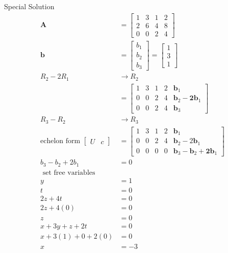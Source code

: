 \documentclass[main.tex]{subfiles}
\begin{document}
\begin{enumerate}
    Special Solution
    $$
    \begin{aligned}
    \boldsymbol{A} &=\left[\begin{array}{llll}
    1 & 3 & 1 & 2 \\
    2 & 6 & 4 & 8 \\
    0 & 0 & 2 & 4
    \end{array}\right] \\
    \boldsymbol{b} &=\left[\begin{array}{l}
    b_{1} \\
    b_{2} \\
    b_{3}
    \end{array}\right]=\left[\begin{array}{l}
    1 \\
    3 \\
    1
    \end{array}\right]\\
    R_2 - 2R_1 & \rightarrow R_2\\  
    & = \left[\begin{array}{ccccc}
    1 & 3 & 1 & 2 & \bm{b}_{1} \\
    0 & 0 & 2 & 4 & \bm{b}_{2}-\bm{2b}_{1} \\
    0 & 0 & 2 & 4 & \bm{b}_{3}
    \end{array}\right]\\
    R_3 - R_2 & \rightarrow R_3\\ 
    \text{echelon form }\left[\begin{array}{ll}
    U & c
    \end{array}\right]&=\left[\begin{array}{ccccc}
    1 & 3 & 1 & 2 & \bm{b}_{1} \\
    0 & 0 & 2 & 4 & \bm{b}_{2}-2 \bm{b}_{1} \\
    0 & 0 & 0 & 0 & \bm{b}_{3}-\bm{b}_{2}+\bm{2} \bm{b}_{1}
    \end{array}\right]\\
    b_{3}-b_{2}+2 b_{1} &= 0 \\    
    \text{ set free variables } & \\
    y &=1 \\
    t &=0 \\
    2 z+4 t &=0 \\
    2 z+4(0) &=0 \\
    z &=0 \\
    x+3 y+z+2 t &=0 \\
    x+3(1)+0+2(0) &=0 \\
    x &=-3 \\

\end{aligned}$$
\end{enumerate}
\end{document}
